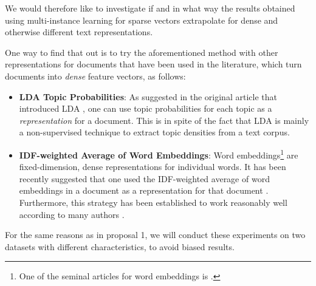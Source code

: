We would therefore like to investigate if and in what way the results obtained using multi-instance learning for sparse vectors extrapolate for dense and otherwise different text representations.

One way to find that out is to try the aforementioned method with other representations for documents that have been used in the literature, which turn documents into \textit{dense} feature vectors, as follows:

\begin{itemize}
    \item \textbf{LDA Topic Probabilities}: As suggested in the original article that introduced LDA \citep{blei_etal_2003}, one can use topic probabilities for each topic as a \textit{representation} for a document. This is in spite of the fact that LDA is mainly a non-supervised technique to extract topic densities from a text corpus.
    
    \item \textbf{IDF-weighted Average of Word Embeddings}: Word embeddings\footnote{One of the seminal articles for word embeddings is \cite{bengio_etal_2003}.} are fixed-dimension, dense representations for individual words. It has been recently suggested that one used the IDF-weighted average of word embeddings in a document as a representation for that document \citep{zhao_etal_2015,correa_etal_2017}. Furthermore, this strategy has been established to work reasonably well according to many authors \citep{wieting_etal_2016,arora_etal_2017}.
    
\end{itemize}

For the same reasons as in proposal 1, we will conduct these experiments on two datasets with different characteristics, to avoid biased results.

